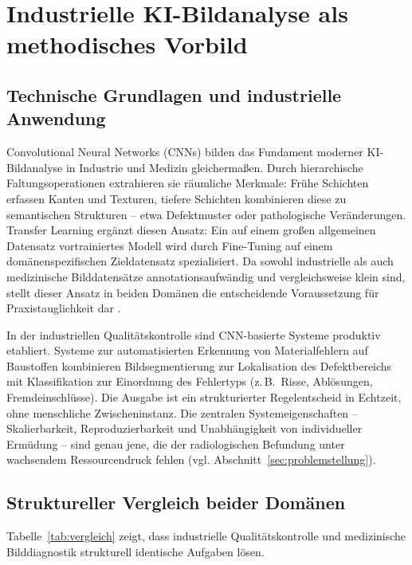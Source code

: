\section{Industrielle KI-Bildanalyse als methodisches Vorbild}
\label{sec:grundlagen}

\subsection{Technische Grundlagen und industrielle Anwendung} \label{sec:cnns}

Convolutional Neural Networks (CNNs) bilden das Fundament moderner KI-Bildanalyse in
Industrie und Medizin gleichermaßen. Durch hierarchische Faltungsoperationen extrahieren
sie räumliche Merkmale: Frühe Schichten erfassen Kanten und Texturen, tiefere Schichten
kombinieren diese zu semantischen Strukturen -- etwa Defektmuster oder pathologische
Veränderungen. Transfer Learning ergänzt diesen Ansatz: Ein auf einem großen allgemeinen
Datensatz vortrainiertes Modell wird durch Fine-Tuning auf einem domänenspezifischen
Zieldatensatz spezialisiert. Da sowohl industrielle als auch medizinische Bilddatensätze
annotationsaufwändig und vergleichsweise klein sind, stellt dieser Ansatz in beiden
Domänen die entscheidende Voraussetzung für Praxistauglichkeit dar \cite{transferMedical2024}.

In der industriellen Qualitätskontrolle sind CNN-basierte Systeme produktiv etabliert.
Systeme zur automatisierten Erkennung von Materialfehlern auf Baustoffen kombinieren
Bildsegmentierung zur Lokalisation des Defektbereichs mit Klassifikation zur Einordnung
des Fehlertyps (z.\,B.\ Risse, Ablösungen, Fremdeinschlüsse). Die Ausgabe ist ein
strukturierter Regelentscheid in Echtzeit, ohne menschliche Zwischeninstanz. Die
zentralen Systemeigenschaften -- Skalierbarkeit, Reproduzierbarkeit und Unabhängigkeit
von individueller Ermüdung -- sind genau jene, die der radiologischen Befundung unter
wachsendem Ressourcendruck fehlen (vgl. Abschnitt~\ref{sec:problemstellung}).

\subsection{Struktureller Vergleich beider Domänen} \label{sec:parallelen}

Tabelle~\ref{tab:vergleich} zeigt, dass industrielle Qualitätskontrolle und medizinische
Bilddiagnostik strukturell identische Aufgaben lösen.

